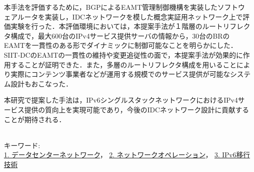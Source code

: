 本手法を評価するために，BGPによるEAMT管理制御機構を実装したソフトウェアルータを実装し，IDCネットワークを模した概念実証用ネットワーク上で評価実験を行った．本評価環境においては，本提案手法が１階層のルートリフレクタ構成で，最大600台のIPv4サービス提供サーバの情報から，30台のBRのEAMTを一貫性のある形でダイナミックに制御可能なことを明らかにした．SIIT-DCのEAMTの一貫性の維持や変更追従性の面で，本提案手法が効果的に作用することが証明できた．また，多層のルートリフレクタ構成を用いることにより実際にコンテンツ事業者などが運用する規模でのサービス提供が可能なシステム設計もおこなった．

本研究で提案した手法は，IPv6シングルスタックネットワークにおけるIPv4サービス提供の質向上を実現可能であり，今後のIDCネットワーク設計に貢献することが期待される．



~ \\

キーワード:\\
\underline{1. データセンターネットワーク}，
\underline{2. ネットワークオペレーション}，
\underline{3. IPv6移行技術}
\begin{flushright}
\dept \\
\author
\end{flushright}
